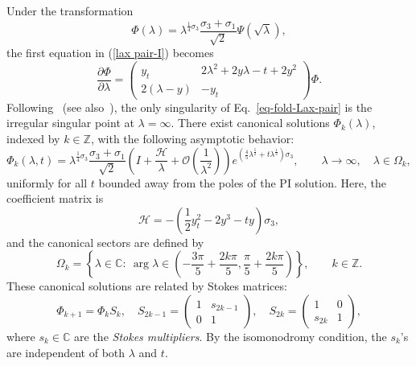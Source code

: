 \documentclass[12pt]{article}
\theoremstyle{plain}
\theoremstyle{definition}
\numberwithin{equation}{section}
\begin{document}
Under the transformation
\begin{equation}\label{eq-transform-canonical solution}
\Phi(\lambda)=\lambda^{\frac{1}{4}\sigma_{3}}\frac{\sigma_{3}+\sigma_{1}}{\sqrt{2}}\Psi(\sqrt{\lambda}),
\end{equation}
the first equation in (\ref{lax pair-I}) becomes
\begin{equation}\label{eq-fold-Lax-pair}
\frac{\partial\Phi}{\partial\lambda}=\left(\begin{matrix}y_{t}&2\lambda^{2}+2y\lambda-t+2y^2\\2(\lambda-y)&-y_{t}\end{matrix}\right)\Phi.
\end{equation}
Following~\cite{Kapaev-Kitaev-1993} (see also~\cite{AAKapaev-2004}), the only singularity of Eq.~\eqref{eq-fold-Lax-pair} is the irregular singular point at \( \lambda = \infty \). There exist canonical solutions \( \Phi_k(\lambda) \), indexed by \( k \in \mathbb{Z} \), with the following asymptotic behavior:
\begin{equation}\label{eq-canonical-solutions}
\Phi_{k}(\lambda,t)
=\lambda^{\frac{1}{4}\sigma_{3}}\frac{\sigma_{3}+\sigma_{1}}{\sqrt{2}}
\left(I+\frac{\mathcal{H}}{\lambda}+\mathcal{O}\left(\frac{1}{\lambda^2}\right)\right)e^{(\frac{4}{5}\lambda^{\frac{5}{2}}+t\lambda^{\frac{1}{2}})\sigma_{3}},
\qquad\lambda\rightarrow\infty,\quad \lambda\in\Omega_{k},
\end{equation}
uniformly for all $t$ bounded away from the poles of the PI solution.  Here, the coefficient matrix is \[
\mathcal{H}=-(\frac{1}{2}y_{t}^2-2y^3-ty)\sigma_{3},
\]
and the canonical sectors are defined by
\[
\Omega_{k}=\left\{\lambda\in\mathbb{C}:~\arg \lambda\in \left(-\frac{3\pi}{5}+\frac{2k\pi}{5},\frac{\pi}{5}+\frac{2k\pi}{5}\right)\right\}, \qquad k\in\mathbb{Z}.
\]
These canonical solutions are related by Stokes matrices:
\begin{equation}\label{eq-Stokes-matrices}
\Phi_{k+1}=\Phi_{k}S_{k},\quad S_{2k-1}=\left(\begin{matrix}1&s_{2k-1}\\0&1\end{matrix}\right),\quad S_{2k}=\left(\begin{matrix}1&0\\s_{2k}&1\end{matrix}\right),
\end{equation}
where \( s_k \in \mathbb{C} \) are the \emph{Stokes multipliers}.
By the isomonodromy condition, the \( s_k \)'s are independent of both \( \lambda \) and \( t \).
\end{document}
